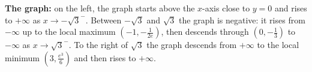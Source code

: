 \begin{solution}
\textbf{The graph:} on the left, the graph starts above the $x$-axis close to $y=0$ and rises to $+\infty$ as $x\to-\sqrt3^-$. Between $-\sqrt3$ and $\sqrt3$ the graph is negative: it rises from $-\infty$ up to the local maximum $(-1,-\frac1{2e})$, then descends through $(0,-\frac13)$ to $-\infty$ as $x\to\sqrt3^-$. To the right of $\sqrt3$ the graph descends from $+\infty$ to the local minimum $(3,\frac{e^3}{6})$ and then rises to $+\infty$.
\end{solution}
